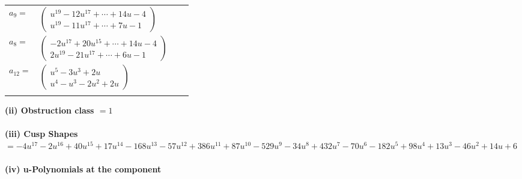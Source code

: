 \documentclass[1p]{elsarticle_modified}
\theoremstyle{definition}
\begin{document}
\begin{tabular}{m{7pt} m{180pt} m{7pt} m{180pt} }
\flushright $a_{9}=$&$\begin{pmatrix}u^{19}-12 u^{17}+\cdots+14 u-4\\u^{19}-11 u^{17}+\cdots+7 u-1\end{pmatrix}$ \\
\flushright $a_{8}=$&$\begin{pmatrix}-2 u^{17}+20 u^{15}+\cdots+14 u-4\\2 u^{19}-21 u^{17}+\cdots+6 u-1\end{pmatrix}$ \\
\flushright $a_{12}=$&$\begin{pmatrix}u^5-3 u^3+2 u\\u^4- u^3-2 u^2+2 u\end{pmatrix}$\\&\end{tabular}
\flushleft \textbf{(ii) Obstruction class $= 1$}\\~\\
\flushleft \textbf{(iii) Cusp Shapes $= -4 u^{17}-2 u^{16}+40 u^{15}+17 u^{14}-168 u^{13}-57 u^{12}+386 u^{11}+87 u^{10}-529 u^9-34 u^8+432 u^7-70 u^6-182 u^5+98 u^4+13 u^3-46 u^2+14 u+6$}\\~\\
\newpage\renewcommand{\arraystretch}{1}
\flushleft \textbf{(iv) u-Polynomials at the component}\newline \\
\end{document}
